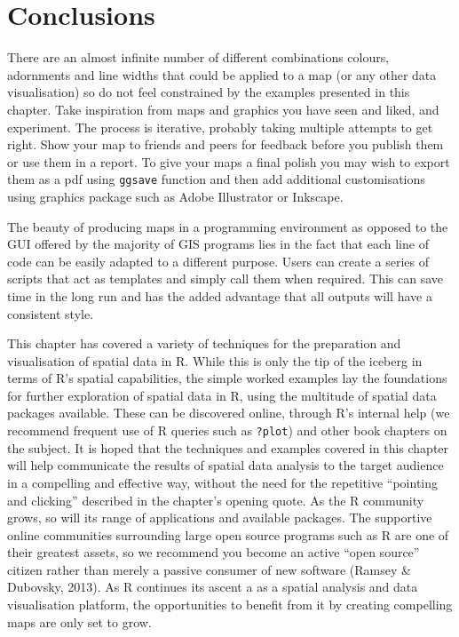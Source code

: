 \documentclass[]{article}
\begin{document}
\section{Conclusions}

There are an almost infinite number of different combinations colours,
adornments and line widths that could be applied to a map (or any other
data visualisation) so do not feel constrained by the examples presented
in this chapter. Take inspiration from maps and graphics you have seen
and liked, and experiment. The process is iterative, probably taking
multiple attempts to get right. Show your map to friends and peers for
feedback before you publish them or use them in a report. To give your
maps a final polish you may wish to export them as a pdf using
\texttt{ggsave} function and then add additional customisations using
graphics package such as Adobe Illustrator or Inkscape.

The beauty of producing maps in a programming environment as opposed to
the GUI offered by the majority of GIS programs lies in the fact that
each line of code can be easily adapted to a different purpose. Users
can create a series of scripts that act as templates and simply call
them when required. This can save time in the long run and has the added
advantage that all outputs will have a consistent style.

This chapter has covered a variety of techniques for the preparation and
visualisation of spatial data in R. While this is only the tip of the
iceberg in terms of R's spatial capabilities, the simple worked examples
lay the foundations for further exploration of spatial data in R, using
the multitude of spatial data packages available. These can be
discovered online, through R's internal help (we recommend frequent use
of R queries such as \texttt{?plot}) and other book chapters on the
subject. It is hoped that the techniques and examples covered in this
chapter will help communicate the results of spatial data analysis to
the target audience in a compelling and effective way, without the need
for the repetitive ``pointing and clicking'' described in the chapter's
opening quote. As the R community grows, so will its range of
applications and available packages. The supportive online communities
surrounding large open source programs such as R are one of their
greatest assets, so we recommend you become an active ``open source''
citizen rather than merely a passive consumer of new software (Ramsey \&
Dubovsky, 2013). As R continues its ascent a as a spatial analysis and
data visualisation platform, the opportunities to benefit from it by
creating compelling maps are only set to grow.
\end{document}
